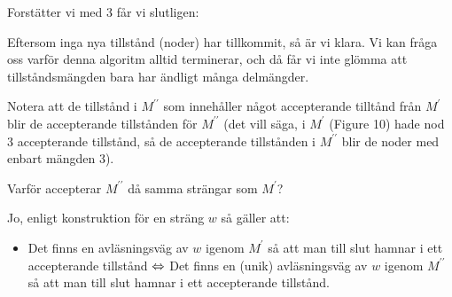\newpage
\noindent Forstätter vi med $3$ får vi slutligen:
\begin{figure}[ht]
    \centering
    \caption{}
\end{figure}
\par\bigskip
\noindent Eftersom inga nya tillstånd (noder) har tillkommit, så är vi klara. Vi kan fråga oss varför denna algoritm alltid terminerar, och då får vi inte glömma att tillståndsmängden bara har ändligt många delmängder.\par
\noindent Notera att de tillstånd i $M^{\prime\prime}$ som innehåller något accepterande tilltånd från $M^{\prime}$ blir de accepterande tillstånden för $M^{\prime\prime}$ (det vill säga, i $M^{\prime}$ (Figure 10) hade nod 3 accepterande tillstånd, så de accepterande tillstånden i $M^{\prime\prime}$ blir de noder med enbart mängden 3).
\par\bigskip
\noindent Varför accepterar $M^{\prime\prime}$ då samma strängar som $M^{\prime}$?\par
\noindent Jo, enligt konstruktion för en sträng $w$ så gäller att:
\begin{itemize}
  \item Det finns en avläsningsväg av $w$ igenom $M^{\prime}$ så att man till slut hamnar i ett accepterande tillstånd $\Leftrightarrow$ Det finns en (unik) avläsningsväg av $w$ igenom $M^{\prime\prime}$ så att man till slut hamnar i ett accepterande tillstånd.
\end{itemize}
